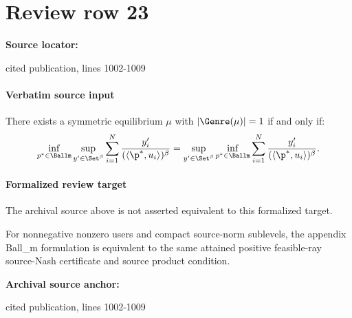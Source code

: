 \documentclass[10pt]{article}
\begin{document}
\section*{Review row 23}
\textbf{Source locator:} {\footnotesize\raggedright cited publication, lines 1002-\allowbreak{}1009\par}
\paragraph{Verbatim source input}
\begin{ReviewVerbatim}
\begin{lemma}
\label{lemma:optimizationprogramrestated}
There exists a symmetric equilibrium $\mu$ with $|\Genre(\mu)| = 1$ if and only if:
\begin{equation}
    \label{eq:optimizationprogramrestated}
\inf_{p^* \in \Ballm} \sup_{y' \in \Set^{\beta}} \sum_{i=1}^N  \frac{y'_i}{(\langle \p^*, u_i \rangle)^{\beta}} = \sup_{y' \in \Set^{\beta}}\inf_{p^* \in \Ballm}  \sum_{i=1}^N  \frac{y'_i}{(\langle \p^*, u_i \rangle)^{\beta}}.
\end{equation}
\end{lemma}
\end{ReviewVerbatim}


\paragraph{Formalized review target}
The archival source above is not asserted equivalent to this formalized target.
\begin{ReviewVerbatim}
For nonnegative nonzero users and compact source-norm sublevels, the appendix Ball_m formulation is equivalent to the same attained positive feasible-ray source-Nash certificate and source product condition.
\end{ReviewVerbatim}

\textbf{Archival source anchor:} {\footnotesize\raggedright cited publication, lines 1002-\allowbreak{}1009\par}
\end{document}
